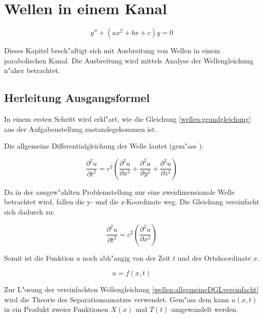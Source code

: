 \chapter{Wellen in einem Kanal\label{chapter:wellen}}
\begin{refsection}

\begin{equation}
	y'' + (ax^2+bx+c)y = 0
	\label{wellen:grundgleichung}
\end{equation}

Dieses Kapitel besch"aftigt sich mit Ausbreitung von Wellen in einem 
parabolischen Kanal. Die Ausbreitung wird mittels Analyse der Wellengleichung 
n"aher betrachtet.

\section{Herleitung Ausgangsformel}
In einem ersten Schritt wird erkl"art, wie die 
Gleichung \ref{wellen:grundgleichung} aus der Aufgabenstellung zustandegekommen 
ist.

Die allgemeine Differentialgleichung der Welle lautet (gem"ass 
\cite{wellen:smirnow2}):

\begin{equation*}
	\frac{\partial^2 u}{\partial t^2}
	=
	c^2
	\left(
		\frac{\partial^2 u}{\partial x^2} 
		+ \frac{\partial^2 u}{\partial y^2} 
		+ \frac{\partial^2 u}{\partial z^2}
	\right)
	\label{wellen:allgemeineDGL}
\end{equation*}

Da in der ausgew"ahlten Problemstellung nur eine zweidimensionale Welle 
betrachtet wird, fallen die y- und die z-Koordinate weg. Die Gleichung 
vereinfacht sich dadurch zu:

\begin{equation}
	\frac{\partial^2 u}{\partial t^2}
	=
	c^2
	\left(
		\frac{\partial^2 u}{\partial x^2} 
	\right)
	\label{wellen:allgemeineDGLvereinfacht}
\end{equation}

Somit ist die Funktion $u$ noch abh"angig von der Zeit $t$ und der 
Ortskoordinate 
$x$.

\begin{equation*}
	u = f(x,t)
\end{equation*}

Zur L"osung der vereinfachten Wellengleichung 
\ref{wellen:allgemeineDGLvereinfacht} wird die Theorie des Separationsansatzes 
verwendet. Gem"ass dem kann $u(x, t)$ in ein Produkt zweier Funktionen $X(x)$ 
und $T(t)$ umgewandelt werden.


\end{refsection}
